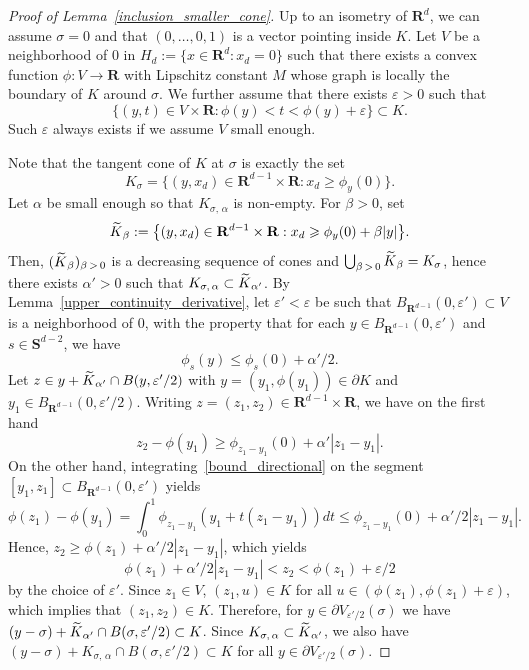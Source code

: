 \documentclass[10pt]{amsart}
\theoremstyle{definition}\newtheorem{defi}[theo]{Definition}\newtheorem{rema}[theo]{Remark}\newtheorem{exam}[theo]{Example}\newtheorem{exem}[theo]{Example}\newtheorem{nota}[theo]{Notation}
\newcommand{\bfS}{\mathbf{S}}
\newcommand{\bfR}{\mathbf{R}}
\renewcommand{\epsilon}{\varepsilon}
\renewcommand{\leq}{\leqslant}
\renewcommand{\geq}{\geqslant}
\let\oldtilde\tilde
\renewcommand*{\tilde}[1]{\mathchoice{\widetilde{#1}}{\widetilde{#1}}{\oldtilde{#1}}{\oldtilde{#1}}}
\begin{document}
\begin{proof}[Proof of Lemma~\ref{inclusion_smaller_cone}]
Up to an isometry of $\bfR^{d}$, we can assume $\sigma=0$ and that $(0,\ldots,0,1)$ is a vector pointing inside $K$. Let $V$ be a neighborhood of $0$ in $H_{d}:=\{ x\in \bfR^{d}:x_{d}=0\}$ such that there exists a convex function $\phi : V\rightarrow \bfR$ with Lipschitz constant $M$ whose graph is locally the boundary of $K$ around $\sigma$. We further assume that there exists $\epsilon>0$ such that
\[
\big\{ (y,t)\in V\times \bfR:\phi(y)<t<\phi(y)+\epsilon\big\} \subset K.
\]
Such $\epsilon$ always exists if we assume $V$ small enough.

Note that the tangent cone of $K$ at $\sigma$ is exactly the set
\[
K_{\sigma}=\big\{ (y,x_{d})\in \bfR^{d-1}\times \bfR: x_{d}\geq \phi_{y}(0)\big\}.
\]
Let $\alpha$ be small enough so that $K_{\sigma,\,\alpha}$ is non-empty. For $\beta>0$, set
\[
\tilde{K}_{\beta}:=\big\{ (y,x_{d})\in \bfR^{d-1}\times \bfR: x_{d}\geq \phi_{y}(0)+\beta| y|\big\}.
\]
Then, $(\tilde{K}_{\beta})_{\beta\,>\,0}$ is a decreasing sequence of cones and $\bigcup_{\beta\,>\,0} \tilde{K}_{\beta}=K_{\sigma}$, hence there exists $\alpha'>0$ such that $K_{\sigma,\,\alpha}\subset \tilde{K}_{\alpha'}$. By Lemma~\ref{upper_continuity_derivative}, let $\epsilon'<\epsilon$ be such that $B_{\bfR^{d-1}}(0,\epsilon')\subset V$ is a neighborhood of $0$, with the property that for each $y\in B_{\bfR^{d-1}}(0,\epsilon')$ and $s\in\bfS^{d-2}$, we have
\begin{equation}\label{bound_directional}
\phi_{s}(y)\leq \phi_{s}(0)+\alpha'/2.
\end{equation}
Let $z\in y+\tilde{K}_{\alpha'}\cap B(y,\epsilon'/2)$ with $y=(y_{1},\phi(y_{1}))\in\partial K$ and $y_{1}\in B_{\bfR^{d-1}}(0,\epsilon'/2)$. Writing $z=(z_{1},z_{2})\in \bfR^{d-1}\times \bfR$, we have on the first hand
\[
z_{2}-\phi(y_{1})\geq \phi_{z_{1}-y_{1}}(0)+\alpha'|z_{1}-y_{1}|.
\]
On the other hand, integrating~\eqref{bound_directional} on the segment $[y_{1},z_{1}]\subset B_{\bfR^{d-1}}(0,\epsilon')$ yields
\[
\phi(z_{1})-\phi(y_{1})=\int_{0}^{1}\phi_{z_{1}-y_{1}}\left(y_{1}+t(z_{1}-y_{1})\right)dt
\leq \phi_{z_{1}-y_{1}}(0)+\alpha'/2|z_{1}-y_{1}|.
\]
Hence, $z_{2}\geq \phi(z_{1})+\alpha'/2| z_{1}-y_{1}|$, which yields
\begin{equation}\label{minimum_slope}
\phi(z_{1})+\alpha'/2|z_{1}-y_{1}|<z_{2}<\phi(z_{1})+\epsilon/2
\end{equation}
by the choice of $\epsilon'$. Since $z_{1}\in V$, $(z_{1},u)\in K$ for all $u\in (\phi(z_{1}),\phi(z_{1})+\epsilon)$, which implies that $(z_{1},z_{2})\in K$. Therefore, for $y\in \partial V_{\epsilon'/2}(\sigma)$ we have $(y-\sigma)+\tilde{K}_{\alpha'}\cap B(\sigma,\epsilon'/2)\subset K$. Since $K_{\sigma,\,\alpha}\subset\tilde{K}_{\alpha'}$, we also have $(y-\sigma)+K_{\sigma,\,\alpha}\cap B(\sigma,\epsilon'/2)\subset K$ for all $y\in \partial V_{\epsilon'/2}(\sigma)$.


\end{proof}
\end{document}
